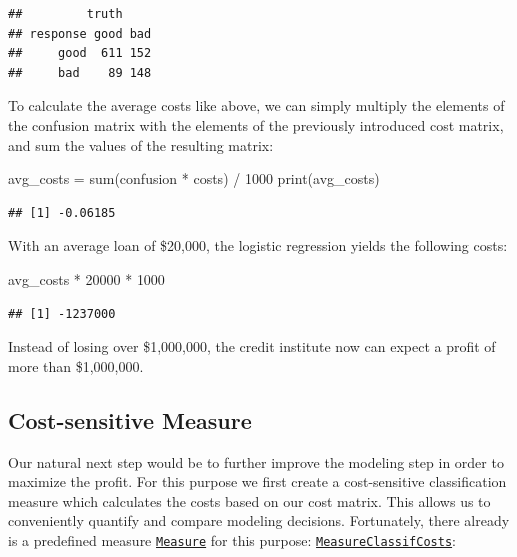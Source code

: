 \documentclass[
]{scrbook}
\newenvironment{Shaded}{\begin{snugshade}}{\end{snugshade}}
\newcommand{\DecValTok}[1]{\textcolor[rgb]{0.00,0.00,0.81}{#1}}
\newcommand{\FunctionTok}[1]{\textcolor[rgb]{0.00,0.00,0.00}{#1}}
\newcommand{\NormalTok}[1]{#1}
\newcommand{\OtherTok}[1]{\textcolor[rgb]{0.56,0.35,0.01}{#1}}
\newcommand{\SpecialCharTok}[1]{\textcolor[rgb]{0.00,0.00,0.00}{#1}}
\renewenvironment{Shaded} {\begin{snugshade}\small} {\end{snugshade}}
\begin{document}
\begin{verbatim}
##         truth
## response good bad
##     good  611 152
##     bad    89 148
\end{verbatim}

To calculate the average costs like above, we can simply multiply the elements of the confusion matrix with the elements of the previously introduced cost matrix, and sum the values of the resulting matrix:

\begin{Shaded}
\begin{Highlighting}[]
\NormalTok{avg\_costs }\OtherTok{=} \FunctionTok{sum}\NormalTok{(confusion }\SpecialCharTok{*}\NormalTok{ costs) }\SpecialCharTok{/} \DecValTok{1000}
\FunctionTok{print}\NormalTok{(avg\_costs)}
\end{Highlighting}
\end{Shaded}

\begin{verbatim}
## [1] -0.06185
\end{verbatim}

With an average loan of \$20,000, the logistic regression yields the following costs:

\begin{Shaded}
\begin{Highlighting}[]
\NormalTok{avg\_costs }\SpecialCharTok{*} \DecValTok{20000} \SpecialCharTok{*} \DecValTok{1000}
\end{Highlighting}
\end{Shaded}

\begin{verbatim}
## [1] -1237000
\end{verbatim}

Instead of losing over \$1,000,000, the credit institute now can expect a profit of more than \$1,000,000.

\hypertarget{cost-sensitive-measure}{%
\subsection{Cost-sensitive Measure}\label{cost-sensitive-measure}}

Our natural next step would be to further improve the modeling step in order to maximize the profit.
For this purpose we first create a cost-sensitive classification measure which calculates the costs based on our cost matrix.
This allows us to conveniently quantify and compare modeling decisions.
Fortunately, there already is a predefined measure \href{https://mlr3.mlr-org.com/reference/Measure.html}{\texttt{Measure}} for this purpose: \href{https://mlr3.mlr-org.com/reference/mlr_measures_classif.costs.html}{\texttt{MeasureClassifCosts}}:
\end{document}
